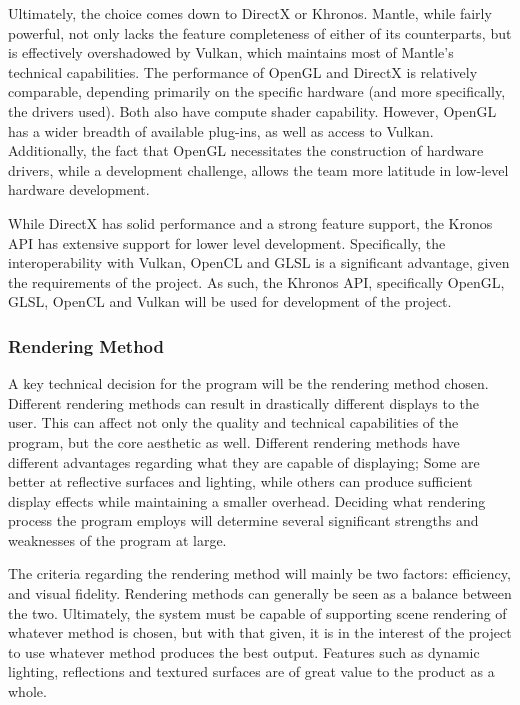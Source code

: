 \documentclass[onecolumn, draftclsnofoot,10pt, compsoc]{IEEEtran}
\newcounter{threesection}[subsubsection]
\begin{document}
Ultimately, the choice comes down to DirectX or Khronos. Mantle, while fairly powerful, not only lacks the feature completeness of either of its counterparts, but is effectively overshadowed by Vulkan, which maintains most of Mantle's technical capabilities. The performance of OpenGL and DirectX is relatively comparable, depending primarily on the specific hardware (and more specifically, the drivers used). Both also have compute shader capability. However, OpenGL has a wider breadth of available plug-ins, as well as access to Vulkan. Additionally, the fact that OpenGL necessitates the construction of hardware drivers, while a development challenge, allows the team more latitude in low-level hardware development.

While DirectX has solid performance and a strong feature support, the Kronos API has extensive support for lower level development. Specifically, the interoperability with Vulkan, OpenCL and GLSL is a significant advantage, given the requirements of the project. As such, the Khronos API, specifically OpenGL, GLSL, OpenCL and Vulkan will be used for development of the project.

\subsubsection{Rendering Method}

A key technical decision for the program will be the rendering method chosen. Different rendering methods can result in drastically different displays to the user. This can affect not only the quality and technical capabilities of the program, but the core aesthetic as well. Different rendering methods have different advantages regarding what they are capable of displaying; Some are better at reflective surfaces and lighting, while others can produce sufficient display effects while maintaining a smaller overhead. Deciding what rendering process the program employs will determine several significant strengths and weaknesses of the program at large.

The criteria regarding the rendering method will mainly be two factors: efficiency, and visual fidelity. Rendering methods can generally be seen as a balance between the two. Ultimately, the system must be capable of supporting scene rendering of whatever method is chosen, but with that given, it is in the interest of the project to use whatever method produces the best output. Features such as dynamic lighting, reflections and textured surfaces are of great value to the product as a whole.
\end{document}
